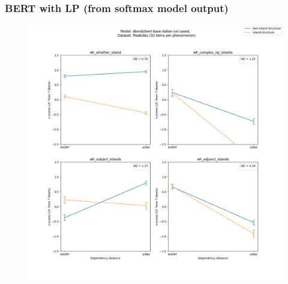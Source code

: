 \subsubsection{BERT with LP (from softmax model output)}
\begin{figure}[h]
	\centering
	\includegraphics[width=1\textwidth]{images/Chapter1/Madeddu_wh_dbmdz_bert-base-italian-xxl-cased_LP-zscores-likert-2022-07-11.png} 
\end{figure}

\clearpage
